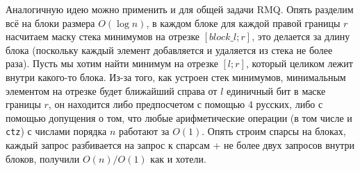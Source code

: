 Аналогичную идею можно применить и для общей задачи RMQ. Опять разделим всё на блоки размера $O(\log n)$, в каждом блоке для каждой правой границы $r$ насчитаем маску стека минимумов на отрезке $[block\_l; r]$, это делается за длину блока (поскольку каждый элемент добавляется и удаляется из стека не более раза). Пусть мы хотим найти минимум на отрезке $[l; r]$, который целиком лежит внутри какого-то блока. Из-за того, как устроен стек минимумов, минимальным элементом на отрезке будет ближайший справа от $l$ единичный бит в маске границы $r$, он находится либо предпосчетом с помощью 4 русских, либо с помощью допущения о том, что любые арифметические операции (в том числе и \texttt{ctz}) с числами порядка $n$ работают за $O(1)$. Опять строим спарсы на блоках, каждый запрос разбивается на запрос к спарсам + не более двух запросов внутри блоков, получили $O(n)/O(1)$ как и хотели.
